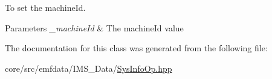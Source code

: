 To set the machineId. 


\begin{DoxyParams}{Parameters}
{\em \_\-machineId} & The machineId value \\
\hline
\end{DoxyParams}


The documentation for this class was generated from the following file:\begin{DoxyCompactItemize}
\item 
core/src/emfdata/IMS\_\-Data/\hyperlink{SysInfoOp_8hpp}{SysInfoOp.hpp}\end{DoxyCompactItemize}
